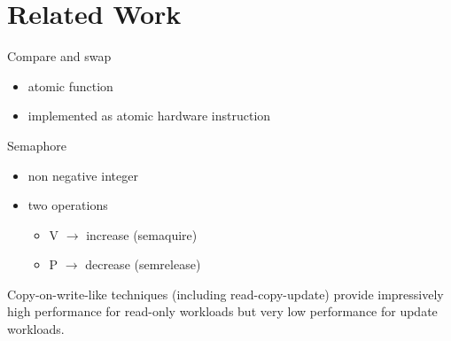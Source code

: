 \chapter{Related Work}

Compare and swap
\begin{itemize}
    \item atomic function
    \item implemented as atomic hardware instruction
\end{itemize}

Semaphore\cite{mullender2008semaphores}
\begin{itemize}
    \item non negative integer
    \item two operations
    \begin{itemize}
        \item V $\rightarrow$ increase (semaquire)
        \item P $\rightarrow$ decrease (semrelease)
    \end{itemize}
\end{itemize}

Copy-on-write-like techniques (including read-copy-update)
provide impressively high performance for read-only workloads
but very low performance for update workloads. \cite{gramoli2015more}